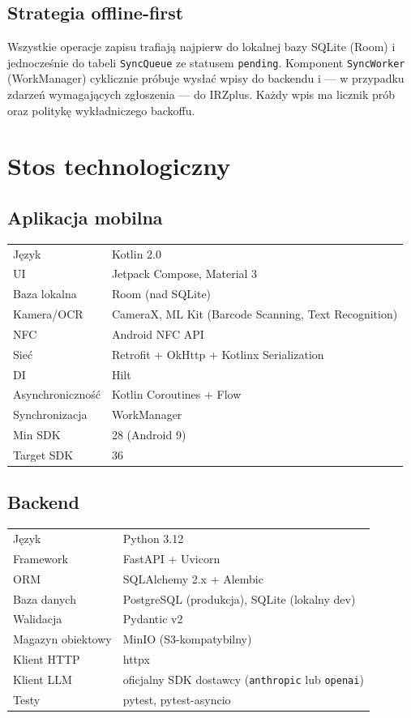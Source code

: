 \documentclass[11pt,a4paper]{article}
\begin{document}
\subsection{Strategia offline-first}

Wszystkie operacje zapisu trafiają najpierw do lokalnej bazy SQLite (Room) i jednocześnie do tabeli \texttt{SyncQueue} ze statusem \texttt{pending}. Komponent \texttt{SyncWorker} (WorkManager) cyklicznie próbuje wysłać wpisy do backendu i --- w przypadku zdarzeń wymagających zgłoszenia --- do IRZplus. Każdy wpis ma licznik prób oraz politykę wykładniczego backoffu.

\section{Stos technologiczny}

\subsection{Aplikacja mobilna}

\begin{tabularx}{\linewidth}{l X}
\toprule
Język & Kotlin 2.0 \\
UI & Jetpack Compose, Material 3 \\
Baza lokalna & Room (nad SQLite) \\
Kamera/OCR & CameraX, ML Kit (Barcode Scanning, Text Recognition) \\
NFC & Android NFC API \\
Sieć & Retrofit + OkHttp + Kotlinx Serialization \\
DI & Hilt \\
Asynchroniczność & Kotlin Coroutines + Flow \\
Synchronizacja & WorkManager \\
Min SDK & 28 (Android 9) \\
Target SDK & 36 \\
\bottomrule
\end{tabularx}

\subsection{Backend}

\begin{tabularx}{\linewidth}{l X}
\toprule
Język & Python 3.12 \\
Framework & FastAPI + Uvicorn \\
ORM & SQLAlchemy 2.x + Alembic \\
Baza danych & PostgreSQL (produkcja), SQLite (lokalny dev) \\
Walidacja & Pydantic v2 \\
Magazyn obiektowy & MinIO (S3-kompatybilny) \\
Klient HTTP & httpx \\
Klient LLM & oficjalny SDK dostawcy (\texttt{anthropic} lub \texttt{openai}) \\
Testy & pytest, pytest-asyncio \\
\bottomrule
\end{tabularx}
\end{document}
